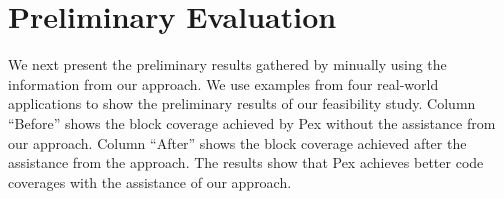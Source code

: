 \section{Preliminary Evaluation}
\label{sec:prelims}

We next present the preliminary results gathered by minually using the information from our approach. We use examples
from four real-world applications to show the preliminary results of our feasibility study. Column ``Before'' shows the block coverage achieved by Pex without the assistance from our approach. Column ``After'' shows the block coverage achieved after the assistance from the approach. The results show that Pex achieves better code coverages with the assistance of our approach.

